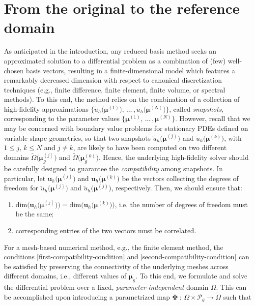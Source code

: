\documentclass[12pt, a4paper, twoside, openright, notitlepage]{report}
\numberwithin{equation}{chapter}
\theoremstyle{theorem}
\theoremstyle{definition}
\theoremstyle{remark}
\theoremstyle{proposition}
\numberwithin{figure}{chapter}
\newcommand{\wt}[1]{\widetilde{#1}}
\newcommand{\bg}[1]{\boldsymbol{#1}}
\begin{document}
	\section{From the original to the reference domain}
	\label{section:From the original to the reference domain}
		
		As anticipated in the introduction, any reduced basis method seeks an approximated solution to a differential problem as a combination of (few) well-chosen basis vectors, resulting in a finite-dimensional model which features a remarkably decreased dimension with respect to canonical discretization techniques (e.g., finite difference, finite element, finite volume, or spectral methods). To this end, the method relies on the combination of a collection of high-fidelity approximations $\big\lbrace \wt{u}_h \big( \bg{\mu}^{(1)} \big), \, \ldots \, , \wt{u}_h \big( \bg{\mu}^{(N)} \big) \big\rbrace$, called \emph{snapshots}, corresponding to the parameter values $\big\lbrace \bg{\mu}^{(1)}, \, \ldots \, , \bg{\mu}^{(N)} \big\rbrace$. However, recall that we may be concerned with boundary value problems for stationary PDEs defined on variable shape geometries, so that two snapshots $\wt{u}_h \big( \bg{\mu}^{(j)} \big)$ and $\wt{u}_h \big( \bg{\mu}^{(k)} \big)$, with $1 \leq j, \, k \leq N$ and $j \neq k$, are likely to have been computed on two different domains $\wt{\Omega}\big( \bg{\mu}_g^{(j)}\big)$ and $\wt{\Omega}\big( \bg{\mu}_g^{(k)}\big)$. Hence, the underlying high-fidelity solver should be carefully designed to guarantee the \emph{compatibility} among snapshots. In particular, let $\mathbf{u}_h\big( \bg{\mu}^{(j)} \big)$ and $\mathbf{u}_h\big( \bg{\mu}^{(k)} \big) $ be the vectors collecting the degrees of freedom for $\wt{u}_h \big( \bg{\mu}^{(j)} \big)$ and $\wt{u}_h \big( \bg{\mu}^{(j)} \big)$, respectively. Then, we should ensure that:		
		\begin{enumerate}[label=(\alph*)]
			\item $\text{dim} \big( \mathbf{u}_h \big( \bg{\mu}^{(j)} \big) \big) = \text{dim} \big( \mathbf{u}_h \big( \bg{\mu}^{(k)} \big) \big)$, i.e. the number of degrees of freedom must be the same;
			\label{first-compatibility-condition}
			\item corresponding entries of the two vectors must be correlated.
			\label{second-compatibility-condition}
		\end{enumerate}	
		For a mesh-based numerical method, e.g., the finite element method, the conditions \ref{first-compatibility-condition} and \ref{second-compatibility-condition} can be satisfied by preserving the connectivity of the underlying meshes across different domains, i.e., different values of $\bg{\mu}_g$. To this end, we formulate and solve the differential problem over a fixed, \emph{parameter-independent} domain $\Omega$. This can be accomplished upon introducing a parametrized map $\bg{\Phi} ~ : ~ \Omega \times \mathcal{P}_g \rightarrow \wt{\Omega}$ such that
\end{document}
